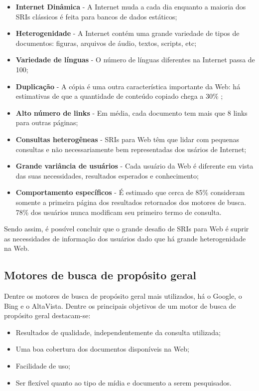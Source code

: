 \begin{itemize}
	\item \textbf{Internet Dinâmica} - A Internet muda a cada dia enquanto a maioria dos SRIs clássicos é feita para bancos de dados estáticos;
	\item \textbf{Heterogenidade} - A Internet contém uma grande variedade de tipos de documentos: figuras, arquivos de áudio, textos, scripts, etc;
	\item \textbf{Variedade de línguas} - O número de línguas diferentes na Internet passa de 100;
	\item \textbf{Duplicação} - A cópia é uma outra característica importante da Web: há estimativas de que a quantidade de conteúdo copiado chega a 30\% \cite{surveyir};
	\item \textbf{Alto número de links} - Em média, cada documento tem mais que 8 links para outras páginas;
	\item \textbf{Consultas heterogêneas} - SRIs para Web têm que lidar com pequenas consultas e não necessariamente bem representadas dos usários de Internet;
	\item \textbf{Grande variância de usuários} - Cada usuário da Web é diferente em vista das suas necessidades, resultados esperados e conhecimento;
	\item \textbf{Comportamento específicos} - É estimado que cerca de 85\% consideram somente a primeira página dos resultados retornados dos motores de busca. 78\% dos usuários nunca modificam seu primeiro termo de consulta.
\end{itemize}

Sendo assim, é possível concluir que o grande desafio de SRIs para Web é suprir as necessidades de informação dos usuários dado que há grande heterogenidade na Web.

\subsection{Motores de busca de propósito geral}

Dentre os motores de busca de propósito geral mais utilizados, há o Google, o Bing e o AltaVista. Dentre os principais objetivos de um motor de busca de propósito geral destacam-se: 

\begin{itemize}
	\item Resultados de qualidade, independentemente da consulta utilizada;
	\item Uma boa cobertura dos documentos disponíveis na Web;
	\item Facilidade de uso;
	\item Ser flexível quanto ao tipo de mídia e documento a serem pesquisados.
\end{itemize}

